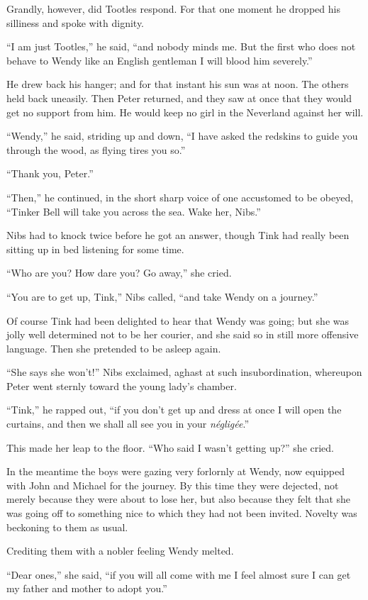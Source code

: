 Grandly, however, did Tootles respond.
For that one moment he dropped his silliness and spoke with dignity.

“I am just Tootles,” he said, “and nobody minds me.
But the first who does not behave to Wendy like an English gentleman I will blood him severely.”

He drew back his hanger;
and for that instant his sun was at noon.
The others held back uneasily.
Then Peter returned, and they saw at once that they would get no support from him.
He would keep no girl in the Neverland against her will.

“Wendy,” he said, striding up and down,
“I have asked the redskins to guide you through the wood,
as flying tires you so.”

“Thank you, Peter.”

“Then,” he continued, in the short sharp voice of one accustomed to be obeyed,
“Tinker Bell will take you across the sea.
Wake her, Nibs.”

Nibs had to knock twice before he got an answer,
though Tink had really been sitting up in bed listening for some time.

“Who are you?
How dare you?
Go away,” she cried.

“You are to get up, Tink,” Nibs called, “and take Wendy on a journey.”

Of course Tink had been delighted to hear that Wendy was going;
but she was jolly well determined not to be her courier,
and she said so in still more offensive language.
Then she pretended to be asleep again.

“She says she won’t!\@” Nibs exclaimed, aghast at such insubordination,
whereupon Peter went sternly toward the young lady’s chamber.

“Tink,” he rapped out,
“if you don’t get up and dress at once I will open the curtains,
and then we shall all see you in your \emph{négligée}.”

This made her leap to the floor.
“Who said I wasn’t getting up?\@” she cried.

In the meantime the boys were gazing very forlornly at Wendy,
now equipped with John and Michael for the journey.
By this time they were dejected,
not merely because they were about to lose her,
but also because they felt that she was going off to something nice to which they had not been invited.
Novelty was beckoning to them as usual.

Crediting them with a nobler feeling Wendy melted.

“Dear ones,” she said, “if you will all come with me
I feel almost sure I can get my father and mother to adopt you.”

